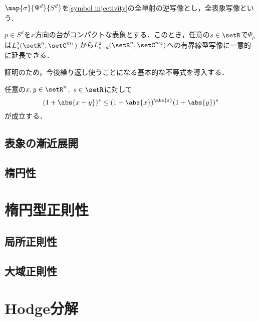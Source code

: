 \documentclass[uplatex,dvipdfmx]{jsarticle}
\newcommand{\sobolev}[1]{L^{2}_{#1}}
\newcommand{\sobolevlocal}[3]{\sobolev{#1}(\setR^{#2},\setC^{#3})}
\begin{document}
\begin{definition}
  $\map{\sigma}{\Psi^d}{S^d}$を\cref{symbol injectivity}の全単射の逆写像とし，全表象写像という．
\end{definition}

\begin{proposition}
  $p\in S^d$を$x$方向の台がコンパクトな表象とする．このとき，任意の$s\in\setR$で$\Psi_p$は$\sobolevlocal{s}{n}{m_1}$
  から$\sobolevlocal{s-d}{n}{m_2}$への有界線型写像に一意的に延長できる．
\end{proposition}

証明のため，今後繰り返し使うことになる基本的な不等式を導入する．

\begin{lemma}[Peetreの不等式]\label{Pettre inequality}
  任意の$x,y\in \setR^n$,\ $s\in\setR$に対して
  \[ (1+\abs{x+y})^s\leq(1+\abs{x})^{\abs{s}}(1+\abs{y})^s \]
  が成立する．
\end{lemma}

\subsection{表象の漸近展開}

\subsection{楕円性}

\newpage
\section{楕円型正則性}

\subsection{局所正則性}

\subsection{大域正則性}

\newpage
\section{Hodge分解}

\newpage

\nocite{*}

\end{document}
